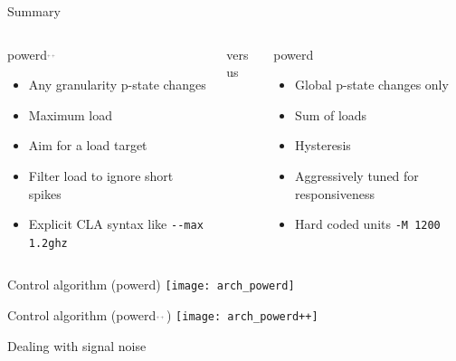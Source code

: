 \documentclass[aspectratio=169]{beamer}
\newcommand{\PDPP}{powerd$^{_{_{++}}}$}
\begin{document}
\begin{frame}{Summary}
\begin{columns}[onlytextwidth]
\begin{column}{0.45\textwidth}
\centering
\PDPP
\begin{itemize}
\item<2-> Any granularity p-state changes
\item<4-> Maximum load
\item<6-> Aim for a load target
\item<8-> Filter load to ignore short spikes
\item<10-> Explicit CLA syntax like \lstinline{--max 1.2ghz}
\end{itemize}
\end{column}
\begin{column}{0.1\textwidth}
\centering
versus
\end{column}
\begin{column}{0.45\textwidth}
\centering
powerd
\begin{itemize}
\item<3-> Global p-state changes only
\item<5-> Sum of loads
\item<7-> Hysteresis
\item<9-> Aggressively tuned for responsiveness
\item<11-> Hard coded units \lstinline{-M 1200}
\end{itemize}
\end{column}
\end{columns}
\end{frame}

\begin{frame}{Control algorithm (powerd)}
\centering
\texttt{[image: arch\_powerd]}
\end{frame}

\begin{frame}{Control algorithm (\PDPP)}
\centering
\texttt{[image: arch\_powerd++]}
\end{frame}

\begin{frame}{Dealing with signal noise}
\end{frame}
\end{document}
